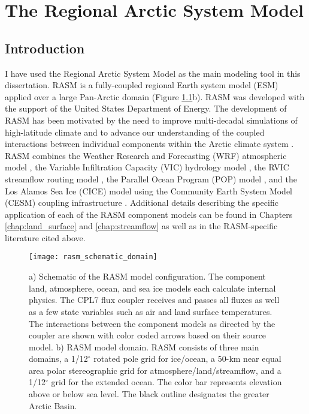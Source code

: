 
\chapter{The Regional Arctic System Model}
\label{chap:rasm}

\section{Introduction}

I have used the Regional Arctic System Model as the main modeling tool in this dissertation.
RASM is a fully-coupled regional Earth system model (ESM) applied over a large Pan-Arctic domain (Figure \ref{fig:rasm}b).
RASM was developed with the support of the United States Department of Energy.
The development of RASM has been motivated by the need to improve multi-decadal simulations of high-latitude climate and to advance our understanding of the coupled interactions between individual components within the Arctic climate system \citep{Roberts_2010}.
RASM combines the Weather Research and Forecasting (WRF) atmospheric model \citep{Skamarock_2008,DuVivier_2016,Cassano_2016}, the Variable Infiltration Capacity (VIC) hydrology model \citep{Liang_1994,Liang_1996,Hamman_2016a}, the RVIC streamflow routing model \citep{Lohmann_1996,Hamman_2016b}, the Parallel Ocean Program (POP) model \citep{Smith_2010,Roberts_2015a}, and the Los Alamos Sea Ice (CICE) model \citep{Hunke2013,Hunke2015,Roberts_2015a} using the Community Earth System Model (CESM) coupling infrastructure \citep[CPL7;][]{Craig_2012,Roberts_2015a}.
Additional details describing the specific application of each of the RASM component models can be found in Chapters \ref{chap:land_surface} and \ref{chap:streamflow} as well as in the RASM-specific literature cited above.

\begin{figure}
  \centering
  \texttt{[image: rasm\_schematic\_domain]}
  \caption{a) Schematic of the RASM model configuration.
  The component land, atmosphere, ocean, and sea ice models each calculate internal physics.
  The CPL7 flux coupler receives and passes all fluxes as well as a few state variables such as air and land surface temperatures.
  The interactions between the component models as directed by the coupler are shown with color coded arrows based on their source model.
  b) RASM model domain.
  RASM consists of three main domains, a 1/12$^{\circ}$ rotated pole grid for ice/ocean, a 50-km near equal area polar stereographic grid for atmosphere/land/streamflow, and a 1/12$^{\circ}$ grid for the extended ocean.
  The color bar represents elevation above or below sea level.
  The black outline designates the greater Arctic Basin.}
  \label{fig:rasm}
\end{figure}

